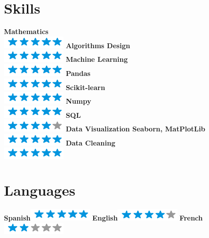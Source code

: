 \documentclass[]{friggeri-cv}
\begin{document}
\begin{aside}
     \section{ Skills}    
    \textbf{Mathematics}\\\includegraphics[scale=0.40]{img/5stars.png}
    \textbf{Algorithms Design}\\\includegraphics[scale=0.40]{img/5stars.png}
    \textbf{Machine Learning}\\\includegraphics[scale=0.40]{img/5stars.png}  
    \textbf{Pandas}\\\includegraphics[scale=0.40]{img/5stars.png}   
     \textbf{Scikit-learn}\\\includegraphics[scale=0.40]{img/5stars.png}   
     \textbf{Numpy}\\\includegraphics[scale=0.40]{img/5stars.png}   
      \textbf{SQL}\\\includegraphics[scale=0.40]{img/4stars.png}    
   \textbf{Data Visualization Seaborn, MatPlotLib }\\\includegraphics[scale=0.40]{img/5stars.png}
   \textbf{Data Cleaning}\\\includegraphics[scale=0.40]{img/5stars.png}
  \section{Languages}
    \textbf{Spanish}\includegraphics[scale=0.40]{img/5stars.png}
    \textbf{English}\includegraphics[scale=0.40]{img/4stars.png}
    \textbf{French}\includegraphics[scale=0.40]{img/2stars.png}
    ~
\end{aside}
\hspace{3cm}
\end{document}
